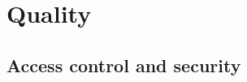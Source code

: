 \section{Quality}
\begin{comment}
	\begin{itemize}
		\item Describe how you test your application and where to find these tests. If
			  applicable, give a link to your continuous integration.
		\item List all known issues.
		\item Run analytical tools on your software and show the results. Use for example:
			  \begin{itemize}
				  \item Dependencies: \href{http://stan4j.com/}{STAN} or similar.
				  \item Quality tool reports, like \href{http://filehippo.com/download_pmd/}{PMD}.
			  \end{itemize}
	\end{itemize}

	NOTE: Each Java, XML, etc. file should have a header comment: Author,
	responsibility, used by ..., uses ..., etc.
\end{comment}


\subsection{Access control and security}